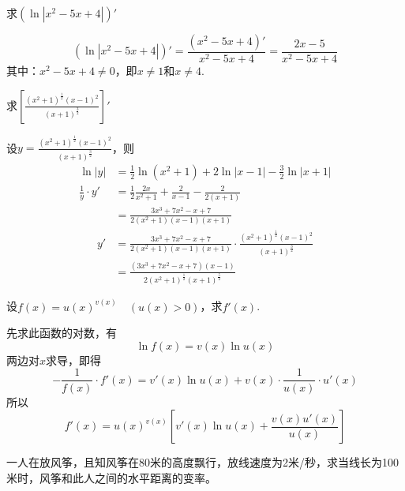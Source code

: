 \begin{example}
    求$(\ln|x^2-5x+4|)'$
\end{example}

\begin{solution}
\[(\ln|x^2-5x+4|)'=\frac{(x^2-5x+4)'}{x^2-5x+4}=\frac{2x-5}{x^2-5x+4}\]
其中：$x^2-5x+4\ne 0$，即$x\ne 1$和$x\ne 4$.
\end{solution}



\begin{example}
求$\left[\frac{(x^2+1)^{\tfrac{1}{2}}(x-1)^2}{(x+1)^{\tfrac{3}{2}}}\right]'$
\end{example}

    
\begin{solution}
设$y=\frac{(x^2+1)^{\tfrac{1}{2}}(x-1)^2}{(x+1)^{\tfrac{3}{2}}}$，则
\[\begin{split}
    \ln|y|&=\frac{1}{2}\ln(x^2+1)+2\ln|x-1|-\frac{3}{2}\ln|x+1|\\
    \frac{1}{y}\cdot y'&=\frac{1}{2}\frac{2x}{x^2+1}+\frac{2}{x-1}-\frac{2}{2(x+1)}\\
    &=\frac{3x^3+7x^2-x+7}{2(x^2+1)(x-1)(x+1)}
\end{split}\]    
\[\begin{split}
    y'&=\frac{3x^3+7x^2-x+7}{2(x^2+1)(x-1)(x+1)}\cdot \frac{(x^2+1)^{\tfrac{1}{2}}(x-1)^2}{(x+1)^{\tfrac{3}{2}}}\\
    &=\frac{(3x^3+7x^2-x+7)(x-1)}{2(x^2+1)^{\tfrac{1}{2}}(x+1)^{\tfrac{5}{2}}}
\end{split}\]
    
\end{solution}

\begin{example}
设$f(x)=u(x)^{v(x)}\quad (u(x)>0)$，求$f'(x)$.
\end{example}

\begin{solution}
先求此函数的对数，有
\[\ln f(x)=v(x)\ln u(x)\]
两边对$x$求导，即得
\[-\frac{1}{f(x)}\cdot f'(x)=v'(x)\ln u(x)+v(x)\cdot\frac{1}{u(x)}\cdot u'(x)\]
    所以
\[f'(x)=u(x)^{v(x)}\left[v'(x)\ln u(x)+\frac{v(x)u'(x)}{u(x)}\right]\]
\end{solution}

\begin{example}
一人在放风筝，且知风筝在80米的高度飘行，放线速度为2米/秒，求当线长为100米时，风筝和此人之间的水平距离的变率。
\end{example}


